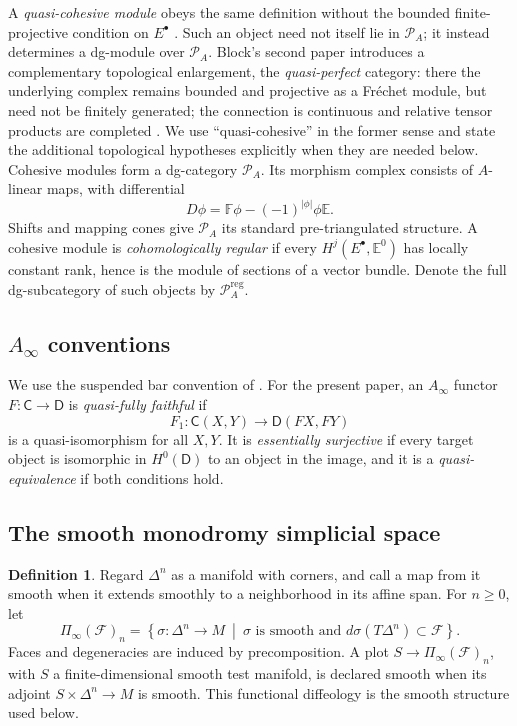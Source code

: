 \documentclass[12pt]{amsart}
\theoremstyle{definition}
\newtheorem{defn}[thm]{Definition}
\theoremstyle{remark}
\numberwithin{equation}{section}
\newcommand{\CC}{{\mathsf C}}
\newcommand{\CD}{{\mathsf D}}
\newcommand{\CF}{{\mathcal F}}
\newcommand{\A}{{A}}
\newcommand{\1}{{\mathbb{1}}}
\begin{document}
A \emph{quasi-cohesive module} obeys the same definition without the
bounded finite-projective condition on $E^\bullet$
\cite[Definition 3.7]{Blo05}.  Such an object need not itself lie in
$\mathcal P_{\A}$; it instead determines a dg-module over
$\mathcal P_{\A}$.  Block's second paper introduces a complementary
topological enlargement, the \emph{quasi-perfect} category: there the
underlying complex remains bounded and projective as a Fr\'echet module,
but need not be finitely generated; the connection is continuous and
relative tensor products are completed \cite[Section 2.2]{Blo06II}.  We use
``quasi-cohesive'' in the former sense and state the additional
topological hypotheses explicitly when they are needed below.
Cohesive modules form a dg-category $\mathcal P_{\A}$.  Its morphism
complex consists of $\A$-linear maps, with differential
\[
 D\phi=\mathbb F\phi-(-1)^{|\phi|}\phi\mathbb E.
\]
Shifts and mapping cones give $\mathcal P_{\A}$ its standard
pre-triangulated structure.  A cohesive module is
\emph{cohomologically regular} if every
$H^j(E^\bullet,\mathbb E^0)$ has locally constant rank, hence is the
module of sections of a vector bundle.  Denote the full dg-subcategory of
such objects by $\mathcal P_{\A}^{\mathrm{reg}}$.

\subsection{$A_{\infty}$ conventions}

We use the suspended bar convention of
\cite[Appendix A]{AS12}.  For the present paper, an $A_{\infty}$ functor
$F:\CC\to\CD$ is \emph{quasi-fully faithful} if
\[
 F_1:\CC(X,Y)\longrightarrow\CD(FX,FY)
\]
is a quasi-isomorphism for all $X,Y$.  It is
\emph{essentially surjective} if every target object is isomorphic in
$H^0(\CD)$ to an object in the image, and it is a
\emph{quasi-equivalence} if both conditions hold.

\subsection{The smooth monodromy simplicial space}

\begin{defn}\label{def:monodromy}
Regard $\Delta^n$ as a manifold with corners, and call a map from it
smooth when it extends smoothly to a neighborhood in its affine span.
For $n\geq0$, let
\[
 \Pi_{\infty}(\CF)_n
 =
 \left\{
 \sigma:\Delta^n\to M\ \middle|\
 \sigma\text{ is smooth and }d\sigma(T\Delta^n)\subset\CF
 \right\}.
\]
Faces and degeneracies are induced by precomposition.  A plot
$S\to\Pi_{\infty}(\CF)_n$, with $S$ a finite-dimensional smooth test
manifold, is declared smooth when its adjoint
$S\times\Delta^n\to M$ is smooth.  This functional diffeology is the
smooth structure used below.
\end{defn}
\end{document}
